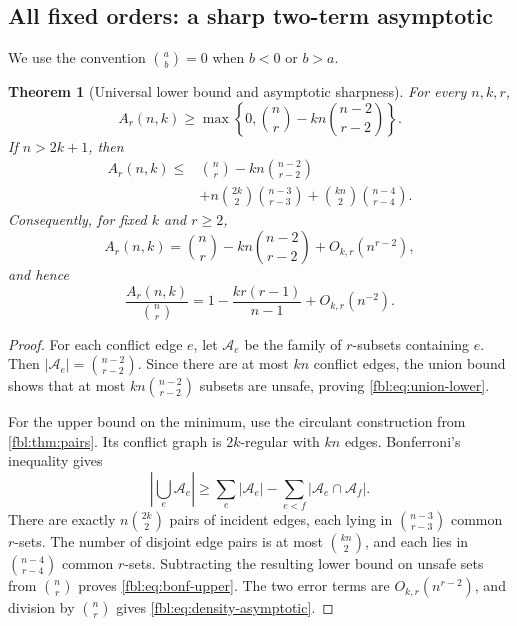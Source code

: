 \documentclass[11pt]{article}
\newtheorem{theorem}{Theorem}[section]
\theoremstyle{definition}
\theoremstyle{remark}
\newcommand{\cA}{\mathcal A}
\begin{document}
\subsection{All fixed orders: a sharp two-term asymptotic}
We use the convention $\binom ab=0$ when $b<0$ or $b>a$.

\begin{theorem}[Universal lower bound and asymptotic sharpness]
\label{fbl:thm:asymptotic}
For every $n,k,r$,
\begin{equation}\label{fbl:eq:union-lower}
 A_r(n,k)
 \ge
 \max\left\{0,
 \binom nr-kn\binom{n-2}{r-2}
 \right\}.
\end{equation}
If $n>2k+1$, then
\begin{align}
 A_r(n,k)
 \le{}&
 \binom nr-kn\binom{n-2}{r-2}
 \nonumber\\
 &+n\binom{2k}{2}\binom{n-3}{r-3}
 +\binom{kn}{2}\binom{n-4}{r-4}.
 \label{fbl:eq:bonf-upper}
\end{align}
Consequently, for fixed $k$ and $r\ge2$,
\begin{equation}\label{fbl:eq:asymptotic}
 A_r(n,k)
 =
 \binom nr-kn\binom{n-2}{r-2}
 +O_{k,r}(n^{r-2}),
\end{equation}
and hence
\begin{equation}\label{fbl:eq:density-asymptotic}
 \frac{A_r(n,k)}{\binom nr}
 =1-\frac{k r(r-1)}{n-1}+O_{k,r}(n^{-2}).
\end{equation}
\end{theorem}

\begin{proof}
For each conflict edge $e$, let $\cA_e$ be the family of $r$-subsets
containing $e$.  Then $\lvert\cA_e\rvert=\binom{n-2}{r-2}$.  Since there are
at most $kn$ conflict edges, the union bound shows that at most
$kn\binom{n-2}{r-2}$ subsets are unsafe, proving
\cref{fbl:eq:union-lower}.

For the upper bound on the minimum, use the circulant construction from
\cref{fbl:thm:pairs}.  Its conflict graph is $2k$-regular with $kn$ edges.
Bonferroni's inequality gives
\[
 \left|\bigcup_e\cA_e\right|
 \ge
 \sum_e|\cA_e|
 -\sum_{e<f}|\cA_e\cap\cA_f|.
\]
There are exactly $n\binom{2k}{2}$ pairs of incident edges, each lying in
$\binom{n-3}{r-3}$ common $r$-sets.  The number of disjoint edge pairs is at
most $\binom{kn}{2}$, and each lies in $\binom{n-4}{r-4}$ common $r$-sets.
Subtracting the resulting lower bound on unsafe sets from $\binom nr$ proves
\cref{fbl:eq:bonf-upper}.  The two error terms are
$O_{k,r}(n^{r-2})$, and division by $\binom nr$ gives
\cref{fbl:eq:density-asymptotic}.
\end{proof}
\end{document}

